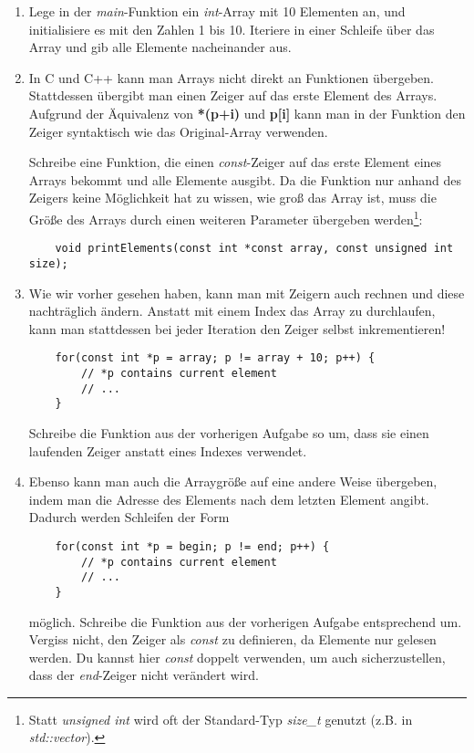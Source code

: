 \begin{enumerate}
\item 
Lege in der \emph{main}-Funktion ein \emph{int}-Array mit 10 Elementen an, und initialisiere es mit den Zahlen 1 bis 10.
Iteriere in einer Schleife über das Array und gib alle Elemente nacheinander aus.

\item
In C und C++ kann man Arrays nicht direkt an Funktionen übergeben.
Stattdessen übergibt man einen Zeiger auf das erste Element des Arrays. Aufgrund der Äquivalenz von \textbf{*(p+i) } und \textbf{p[i]} kann man in der Funktion den Zeiger syntaktisch wie das Original-Array verwenden.

Schreibe eine Funktion, die einen \emph{const}-Zeiger auf das erste Element eines Arrays bekommt und alle Elemente ausgibt.
Da die Funktion nur anhand des Zeigers keine Möglichkeit hat zu wissen, wie groß das Array ist, muss die Größe des Arrays durch einen weiteren Parameter übergeben werden\footnote{Statt \emph{unsigned int} wird oft der Standard-Typ \emph{size\_t} genutzt (z.B. in \emph{std::vector}).}:
\begin{lstlisting}
	void printElements(const int *const array, const unsigned int size);
\end{lstlisting}

\item
Wie wir vorher gesehen haben, kann man mit Zeigern auch rechnen und diese nachträglich ändern.
Anstatt mit einem Index das Array zu durchlaufen, kann man stattdessen bei jeder Iteration den Zeiger selbst inkrementieren! 

\begin{lstlisting}
	for(const int *p = array; p != array + 10; p++) {
		// *p contains current element
		// ...
	}
\end{lstlisting}

Schreibe die Funktion aus der vorherigen Aufgabe so um, dass sie einen laufenden Zeiger anstatt eines Indexes verwendet.

\item
Ebenso kann man auch die Arraygröße auf eine andere Weise übergeben, indem man die Adresse des Elements nach dem letzten Element angibt.
Dadurch werden Schleifen der Form
\begin{lstlisting}
	for(const int *p = begin; p != end; p++) {
		// *p contains current element
		// ...
	}
\end{lstlisting}

möglich.
Schreibe die Funktion aus der vorherigen Aufgabe entsprechend um.
Vergiss nicht, den Zeiger als \emph{const} zu definieren, da Elemente nur gelesen werden.
Du kannst hier \emph{const} doppelt verwenden, um auch sicherzustellen, dass der \emph{end}-Zeiger nicht verändert wird.


\end{enumerate}
